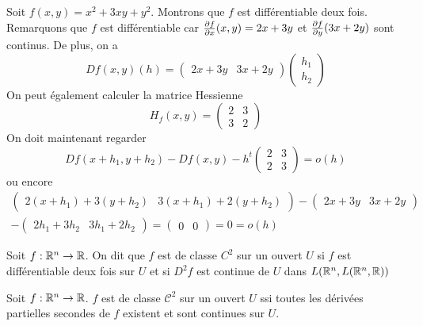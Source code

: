 \begin{exemple}
    Soit $f(x,y) = x^2 + 3 xy + y^2$. Montrons que $f$ est différentiable deux fois. Remarquons que $f$ est différentiable car $\frac{\partial f}{\partial x}(x,y) = 2x + 3y$ et $\frac{\partial f}{\partial y}(3x+2y)$ sont continus.
    De plus, on a
    $$Df(x,y)(h)=\begin{pmatrix}
        2x+ 3 y & 3x + 2y
    \end{pmatrix}
    \begin{pmatrix}
        h_1\\h_2
    \end{pmatrix}$$
    On peut également calculer la matrice Hessienne
    $$H_f(x,y)=
    \begin{pmatrix}
    2 & 3 \\
    3 & 2
    \end{pmatrix}$$
     On doit maintenant regarder
     $$Df(x+h_1, y+h_2)-Df(x,y)-h^t\begin{pmatrix}
         2 & 3\\
         2& 3
     \end{pmatrix} = o(h)$$
     ou encore 
     \begin{multline*}
         \begin{pmatrix}
         2(x+h_1) + 3(y+h_2) & 3(x+h_1) + 2(y+h_2) 
     \end{pmatrix}-
     \begin{pmatrix}
         2x + 3y & 3x + 2y  
     \end{pmatrix}\\-
     \begin{pmatrix}
         2h_1 + 3h_2 & 3h_1 + 2h_2 
     \end{pmatrix} = \begin{pmatrix}
         0 & 0
     \end{pmatrix} = 0 = o(h)
     \end{multline*}
\end{exemple}

\begin{definition}
    Soit $f:\mathbb{R}^n \to \mathbb{R}$. On dit que $f$ est de classe $C^2$ sur un ouvert $U$ si $f$ est différentiable deux fois sur $U$ et si $D^2f$ est continue de $U$ dans $L(\mathbb{R}^n, L(\mathbb{R}^n,\mathbb{R}))$
\end{definition}

 \begin{proposition}
     Soit $f:\mathbb{R}^n\to \mathbb{R}$. $f$ est de classe $\mathcal C^2$ sur un ouvert $U$ ssi toutes les dérivées partielles secondes de $f$ existent et sont continues sur $U$.
 \end{proposition}
